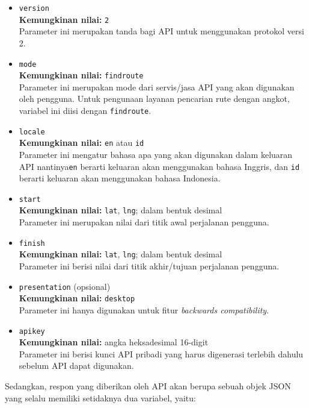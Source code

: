 \begin{itemize}
	\item \verb|version|\\
	\textbf{Kemungkinan nilai:} \verb|2|\\
	Parameter ini merupakan tanda bagi API untuk menggunakan protokol versi 2.
	\item \verb|mode|\\
	\textbf{Kemungkinan nilai:} \verb|findroute|\\
	Parameter ini merupakan mode dari servis/jasa API yang akan digunakan oleh pengguna. Untuk pengunaan layanan pencarian rute dengan angkot, variabel ini diisi dengan \verb|findroute|.
	\item \verb|locale|\\
	\textbf{Kemungkinan nilai:} \verb|en| atau \verb|id|\\
	Parameter ini mengatur bahasa apa yang akan digunakan dalam keluaran API nantinya\textemdash\verb|en| berarti keluaran akan menggunakan bahasa Inggris, dan \verb|id| berarti keluaran akan menggunakan bahasa Indonesia.
	\item \verb|start|\\
	\textbf{Kemungkinan nilai:} \verb|lat|, \verb|lng|; dalam bentuk desimal\\
	Parameter ini merupakan nilai \latlon dari titik awal perjalanan pengguna.
	\item \verb|finish|\\
	\textbf{Kemungkinan nilai:} \verb|lat|, \verb|lng|; dalam bentuk desimal\\
	Parameter ini berisi nilai \latlon dari titik akhir/tujuan perjalanan pengguna.
	\item \verb|presentation| (opsional)\\
	\textbf{Kemungkinan nilai:} \verb|desktop|\\
	Parameter ini hanya digunakan untuk fitur \textit{backwards compatibility}.
	\item \verb|apikey|\\
	\textbf{Kemungkinan nilai:} angka heksadesimal 16-digit\\
	Parameter ini berisi kunci API pribadi yang harus digenerasi terlebih dahulu sebelum API dapat digunakan.
\end{itemize}
\vspace{\baselineskip}
Sedangkan, respon yang diberikan oleh API akan berupa sebuah objek JSON yang selalu memiliki setidaknya dua variabel, yaitu:

